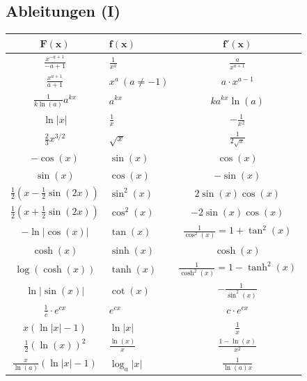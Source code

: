\documentclass[a4paper,10pt]{article}
\begin{document}
\subsection{Ableitungen (I)}
\begin{center}
  \begin{tabularx}{\linewidth}{c>{\centering\arraybackslash}Xc}
  \toprule
  $\mathbf{F(x)}$ & $\mathbf{f(x)}$ & $\mathbf{f'(x)}$ \\
  \midrule
  $\frac{x^{-a+1}}{-a+1}$ & $\frac{1}{x^a}$ & $\frac{a}{x^{a+1}}$ \\
  $\frac{x^{a+1}}{a+1}$ & $x^a \ (a \ne -1)$ & $a \cdot x^{a-1}$ \\
  $\frac{1}{k \ln(a)}a^{kx}$ & $a^{kx}$ & $ka^{kx} \ln(a)$ \\
  $\ln |x|$ & $\frac{1}{x}$ & $-\frac{1}{x^2}$ \\
  $\frac{2}{3}x^{3/2}$ & $\sqrt{x}$ & $\frac{1}{2\sqrt{x}}$\\
  $-\cos(x)$ & $\sin(x)$ & $\cos(x)$ \\
  $\sin(x)$ & $\cos(x)$ & $-\sin(x)$ \\
  $\frac{1}{2}(x-\frac{1}{2}\sin(2x))$ & $\sin^2(x)$ & $2 \sin(x)\cos(x)$ \\
  $\frac{1}{2}(x + \frac{1}{2}\sin(2x))$ & $\cos^2(x)$ & $-2\sin(x)\cos(x)$ \\
  $-\ln|\cos(x)|$ & $\tan(x)$ & $\frac{1}{\cos^2(x)} = 1 + \tan^2(x)$  \\
  $\cosh(x)$ & $\sinh(x)$ & $\cosh(x)$ \\
  $\log(\cosh(x))$ & $\tanh(x)$ & $\frac{1}{\cosh^2(x)} = 1 - \tanh^2(x)$ \\
  $\ln | \sin(x)|$ & $\cot(x)$ & $-\frac{1}{\sin^2(x)}$ \\
  $\frac{1}{c} \cdot e^{cx}$ & $e^{cx}$ & $c \cdot e^{cx}$ \\
  $x(\ln |x| - 1)$ & $\ln |x|$ & $\frac{1}{x}$ \\
  $\frac{1}{2}(\ln(x))^2$ & $\frac{\ln(x)}{x}$ & $\frac{1 - \ln(x)}{x^2}$ \\
  $\frac{x}{\ln(a)} (\ln|x| -1)$ & $\log_a |x|$ & $\frac{1}{\ln(a)x}$ \\
  \bottomrule
  \end{tabularx}
\end{center}
\end{document}
